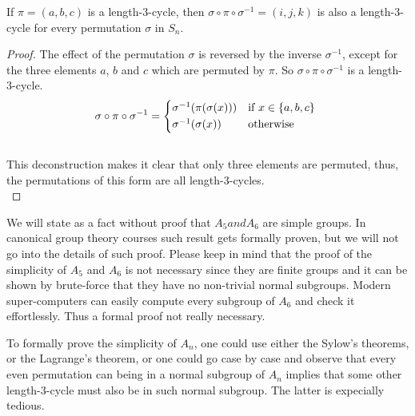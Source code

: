 \begin{lemma}
    If $\pi = (a,b,c)$ is a length-3-cycle, then $\sigma \circ \pi \circ \sigma^{-1} = (i,j,k)$
    is also a length-3-cycle for every permutation $\sigma$ in $S_n$. 
\end{lemma}
\begin{proof}
   The effect of the permutation $\sigma$ is reversed by the inverse $\sigma^{-1}$, except for 
   the three elements $a$, $b$ and $c$ which are permuted by $\pi$. So $\sigma \circ \pi \circ 
   \sigma^{-1}$ is a length-3-cycle. \\


   \begin{equation*}
        \sigma \circ \pi \circ \sigma^{-1} = 
        \begin{cases*}
            \sigma^{-1}(\pi(\sigma(x)))   & \text{if} \( x \in \{a,b,c\} \)  \\
            \sigma^{-1}(\sigma(x))        & \text{otherwise}       \\
        \end{cases*}
    \end{equation*} \\

    This deconstruction makes it clear that only three elements are permuted, thus, the
    permutations of this form are all length-3-cycles. \\ 
\end{proof} \vspace{0.2em}

We will state as a fact without proof that $A_5 and A_6$ are simple groups. In canonical group theory 
courses such result gets formally proven, but we will not go into the details of such proof. Please 
keep in mind that the proof of the simplicity of $A_5$ and $A_6$ is not necessary since 
they are finite groups and it can be shown by brute-force that they have no non-trivial normal
subgroups. Modern super-computers can easily compute every subgroup of $A_6$ and check it 
effortlessly. Thus a formal proof not really necessary. \\

\newpage

To formally prove the simplicity of $A_n$, one could use either the Sylow's theorems, or 
the Lagrange's theorem, or one could go case by case and observe that every even permutation 
can being in a normal subgroup of $A_n$ implies that some other length-3-cycle must also be in
such normal subgroup. The latter is expecially tedious. \\


